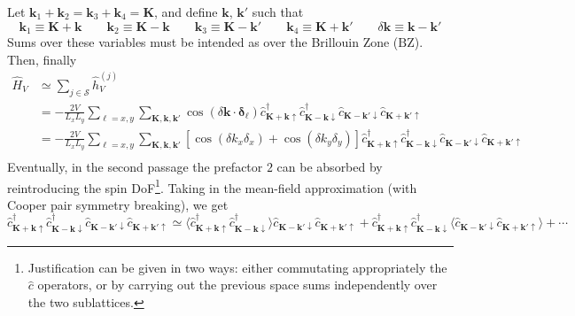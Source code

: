 Let $\mathbf{k}_1 + \mathbf{k}_2 = \mathbf{k}_3 + \mathbf{k}_4 = \mathbf{K}$, and define $\mathbf{k}$, $\mathbf{k}'$ such that
\[
	\mathbf{k}_1 \equiv \mathbf{K} + \mathbf{k} 
	\qquad
	\mathbf{k}_2 \equiv \mathbf{K} - \mathbf{k} 
	\qquad
	\mathbf{k}_3 \equiv \mathbf{K} - \mathbf{k}' 
	\qquad
	\mathbf{k}_4 \equiv \mathbf{K} + \mathbf{k}'
	\qquad
	\delta \mathbf{k} \equiv \mathbf{k}-\mathbf{k}'
\]
Sums over these variables must be intended as over the Brillouin Zone ($\mathrm{BZ}$). Then, finally
\[
\begin{aligned}
	\hat H_V &\simeq \sum_{j \in \mathcal{S}} \hat h_V^{(j)} \\
	&= - \frac{2V}{L_x L_y} \sum_{\ell = x,y} \sum_{\mathbf{K}, \mathbf{k}, \mathbf{k}'} \cos\left(
		\delta \mathbf{k} \cdot \bm{\delta}_\ell
	\right)	\hat c_{\mathbf{K}+\mathbf{k} \uparrow}^\dagger \hat c_{\mathbf{K}-\mathbf{k} \downarrow}^\dagger \hat c_{\mathbf{K}-\mathbf{k}' \downarrow} \hat c_{\mathbf{K}+\mathbf{k}'\uparrow} \\
	&= - \frac{2V}{L_x L_y} \sum_{\ell = x,y} \sum_{\mathbf{K}, \mathbf{k}, \mathbf{k}'} \left[
		\cos \left(
			\delta k_x \delta_x
		\right)	+ \cos \left(
			\delta k_y \delta_y
		\right)	
	\right]	\hat c_{\mathbf{K}+\mathbf{k} \uparrow}^\dagger \hat c_{\mathbf{K}-\mathbf{k} \downarrow}^\dagger \hat c_{\mathbf{K}-\mathbf{k}' \downarrow} \hat c_{\mathbf{K}+\mathbf{k}'\uparrow} \\
\end{aligned}
\]
Eventually, in the second passage the prefactor $2$ can be absorbed by reintroducing the spin DoF\footnote{
	Justification can be given in two ways: either commutating appropriately the $\hat c$ operators, or by carrying out the previous space sums independently over the two sublattices.
}. Taking in the mean-field approximation (with Cooper pair symmetry breaking), we get
\[
	\hat c_{\mathbf{K}+\mathbf{k} \uparrow}^\dagger \hat c_{\mathbf{K}-\mathbf{k} \downarrow}^\dagger \hat c_{\mathbf{K}-\mathbf{k}' \downarrow} \hat c_{\mathbf{K}+\mathbf{k}'\uparrow} \simeq \langle
		\hat c_{\mathbf{K}+\mathbf{k} \uparrow}^\dagger \hat c_{\mathbf{K}-\mathbf{k} \downarrow}^\dagger
	\rangle \hat c_{\mathbf{K}-\mathbf{k}' \downarrow} \hat c_{\mathbf{K}+\mathbf{k}'\uparrow} + \hat c_{\mathbf{K}+\mathbf{k} \uparrow}^\dagger \hat c_{\mathbf{K}-\mathbf{k} \downarrow}^\dagger \langle 
		\hat c_{\mathbf{K}-\mathbf{k}' \downarrow} \hat c_{\mathbf{K}+\mathbf{k}'\uparrow}
	\rangle + \cdots
\]
